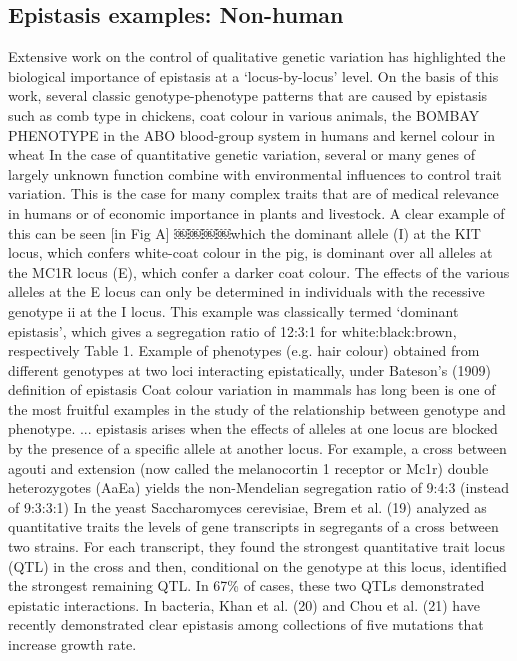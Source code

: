 \subsection{Epistasis examples: Non-human}
 Extensive work on the control of qualitative genetic variation has highlighted the biological importance of epistasis at a ‘locus-by-locus' level. On the basis of this work, several classic genotype-phenotype patterns that are caused by epistasis such as comb type in chickens, coat colour in various animals, the BOMBAY PHENOTYPE in the ABO blood-group system in humans and kernel colour in wheat \cite{carlborg2004epistasis}
In the case of quantitative genetic variation, several or many genes of largely unknown function combine with environmental influences to control trait variation. This is the case for many complex traits that are of medical relevance in humans or of economic importance in plants and livestock. \cite{carlborg2004epistasis}
A clear example of this can be seen  [in Fig A]  ￼￼￼￼which the dominant allele (I) at the KIT locus, which confers white-coat colour in the pig, is dominant over all alleles at the MC1R locus (E), which confer a darker coat colour. The effects of the various alleles at the E locus can only be determined in individuals with the recessive genotype ii at the I locus. This example was classically termed `dominant epistasis', which gives a segregation ratio of 12:3:1 for white:black:brown, respectively \cite{carlborg2004epistasis}
 Table 1. Example of phenotypes (e.g. hair colour) obtained from different genotypes at two loci interacting epistatically, under Bateson's (1909) definition of epistasis \cite{cordell2002epistasis}
Coat colour variation in mammals has long been is one of the most fruitful examples in the study of the relationship between genotype and phenotype. ... epistasis arises when the effects of alleles at one locus are blocked by the presence of a specific allele at another locus. For example, a cross between agouti and extension (now called the melanocortin 1 receptor or Mc1r) double heterozygotes (AaEa) yields the non-Mendelian segregation ratio of 9:4:3 (instead of 9:3:3:1) \cite{phillips2008epistasis}
In the yeast Saccharomyces cerevisiae, Brem et al. (19) analyzed as quantitative traits the levels of gene transcripts in segregants of a cross between two strains. For each transcript, they found the strongest quantitative trait locus (QTL) in the cross and then, conditional on the genotype at this locus, identified the strongest remaining QTL. In 67\% of cases, these two QTLs demonstrated epistatic interactions. In bacteria, Khan et al. (20) and Chou et al. (21) have recently demonstrated clear epistasis among collections of five mutations that increase growth rate.  \cite{zuk2012mystery}
